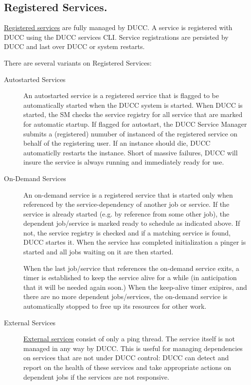       \subsection{Registered Services.} \hyperref[sec:cli.ducc-services]{Registered services} are
      fully managed by DUCC. A service is registered with DUCC using the DUCC services CLI. Service
      registrations are persisted by DUCC and last over DUCC or system restarts.

      There are several variants on Registered Services:
      \begin{description}

        \item[Autostarted Services] An autostarted service is a registered service that is flagged to be
          automatically started when the DUCC system is started. When DUCC is started, the SM checks the
          service registry for all service that are marked for automatic startup.  If flagged for autostart,
          the DUCC Service Manager submits a (registered) numuber of instanced of the registered service
          on behalf of the registering user.  If an instance should die, DUCC automaticlly restarts
          the instance.  Short of massive failures, DUCC will insure the service is always running
          and immediately ready for use.
          
        \item[On-Demand Services] An on-demand service is a registered service that is started only
          when referenced by the service-dependency of another job or service. If the service is
          already started (e.g. by reference from some other job), the dependent job/service is
          marked ready to schedule as indicated above. If not, the service registry is checked and
          if a matching service is found, DUCC startes it. When the service has completed
          initialization a pinger is started and all jobs waiting on it are then started.
          
          When the last job/service that references the on-demand service exits, a timer is
          established to keep the service alive for a while (in anticipation that it will be needed
          again soon.)  When the keep-alive timer exipires, and there are no more dependent
          jobs/services, the on-demand service is automatically stopped to free up its resources for
          other work.

        \item[External Services] \hyperref[sec:services.external]{External services} consist of only
          a ping thread.  The service itself is not managed in any way by DUCC.  This is useful for
          managing dependencies on services that are not under DUCC control: DUCC can detect and
          report on the health of these services and take appropriate actions on dependent jobs if
          the services are not responsive.
      \end{description}
          
